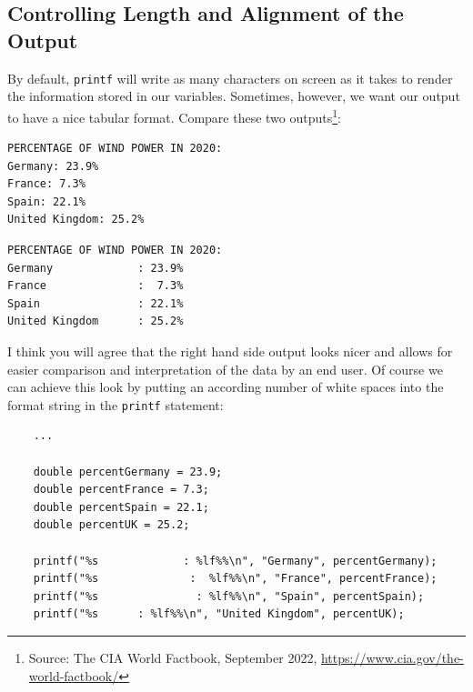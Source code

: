 \subsection{Controlling Length and Alignment of the Output}
By default, \texttt{printf} will write as many characters on screen as it takes to render the information stored in our variables. Sometimes, however, we want our output to have a nice tabular format. Compare these two outputs\footnote{Source: The CIA World Factbook, September 2022, \url{https://www.cia.gov/the-world-factbook/}}:
\begin{tcbraster}[raster columns=2,
                  raster equal height,
                  nobeforeafter,
                  raster column skip=0.2cm]
\begin{cmdbox}
\begin{verbatim}
PERCENTAGE OF WIND POWER IN 2020:
Germany: 23.9%
France: 7.3%
Spain: 22.1%
United Kingdom: 25.2%
\end{verbatim}
\end{cmdbox}
%
\begin{cmdbox}
\begin{verbatim}
PERCENTAGE OF WIND POWER IN 2020:
Germany             : 23.9%
France              :  7.3%
Spain               : 22.1%
United Kingdom      : 25.2%
\end{verbatim}
\end{cmdbox}
\end{tcbraster}

I think you will agree that the right hand side output looks nicer and allows for easier comparison and interpretation of the data by an end user. Of course we can achieve this look by putting an according number of white spaces into the format string in the \texttt{printf} statement:
\begin{warnbox}[manuallyAlignedOutput.c, leftupper=7mm]
\begin{verbatim}
    ...

    double percentGermany = 23.9;
    double percentFrance = 7.3;
    double percentSpain = 22.1;
    double percentUK = 25.2;

    printf("%s             : %lf%%\n", "Germany", percentGermany);
    printf("%s              :  %lf%%\n", "France", percentFrance);
    printf("%s               : %lf%%\n", "Spain", percentSpain);
    printf("%s      : %lf%%\n", "United Kingdom", percentUK);
\end{verbatim}
\end{warnbox}

